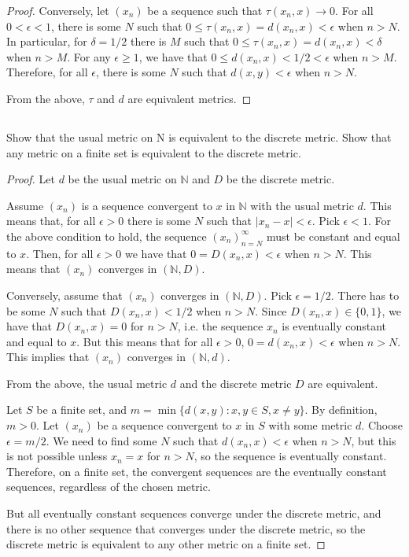 \begin{proof}
Conversely, let $(x_n)$ be a sequence such that $\tau(x_n, x) \rightarrow 0$.
For all $0 < \epsilon < 1$, there is some $N$ such that $0 \leq \tau(x_n, x) = d(x_n, x) < \epsilon$ when $n>N$. 
In particular, for $\delta = 1/2$ there is $M$ such that $0 \leq \tau(x_n, x) = d(x_n, x) < \delta$ when $n>M$. For any $\epsilon \geq 1$, we have that $0 \leq d(x_n, x) < 1/2 < \epsilon$ when $n>M$. Therefore, for all $\epsilon$, there is some $N$ such that $d(x,y) < \epsilon$ when $n>N$. 

From the above, $\tau$ and $d$ are equivalent metrics.

\end{proof}

\subsection{} Show that the usual metric on N is equivalent to the discrete metric. Show that any metric on a finite set is equivalent to the discrete metric.

\begin{proof}
Let $d$ be the usual metric on $\mathbb{N}$ and $D$ be the discrete metric.

Assume $(x_n)$ is a sequence convergent to $x$ in $\mathbb{N}$ with the usual metric $d$. This means that, for all $\epsilon > 0$ there is some $N$ such that $|x_n - x| < \epsilon$. Pick $\epsilon < 1$. For the above condition to hold, the sequence $(x_n)_{n=N}^\infty$ must be constant and equal to $x$. Then, for all $\epsilon>0$ we have that $0 = D(x_n, x) < \epsilon$ when $n>N$. This means that $(x_n)$ converges in $(\mathbb{N}, D)$.

Conversely, assume that $(x_n)$ converges in $(\mathbb{N}, D)$. Pick $\epsilon = 1/2$. There has to be some $N$ such that $D(x_n, x) < 1/2$ when $n>N$. Since $D(x_n, x) \in \{0,1\}$, we have that $D(x_n, x) = 0$ for $n>N$, i.e. the sequence $x_n$ is eventually constant and equal to $x$. But this means that for all $\epsilon > 0$, $0 = d(x_n, x) < \epsilon$ when $n>N$. This implies that $(x_n)$ converges in $(\mathbb{N}, d)$.

From the above, the usual metric $d$ and the discrete metric $D$ are equivalent.


\vspace{1em}

Let $S$ be a finite set, and $m = \min\{d(x,y): x,y \in S, x \neq y\}$. By definition, $m>0$. Let $(x_n)$ be a sequence convergent to $x$ in $S$ with some metric $d$. Choose $\epsilon = m/2$. We need to find some $N$ such that $d(x_n, x) < \epsilon$ when $n>N$, but this is not possible unless $x_n = x$ for $n>N$, so the sequence is eventually constant. Therefore, on a finite set, the convergent sequences are the eventually constant sequences, regardless of the chosen metric.

But all eventually constant sequences converge under the discrete metric, and there is no other sequence that converges under the discrete metric, so the discrete metric is equivalent to any other metric on a finite set.

\end{proof}

